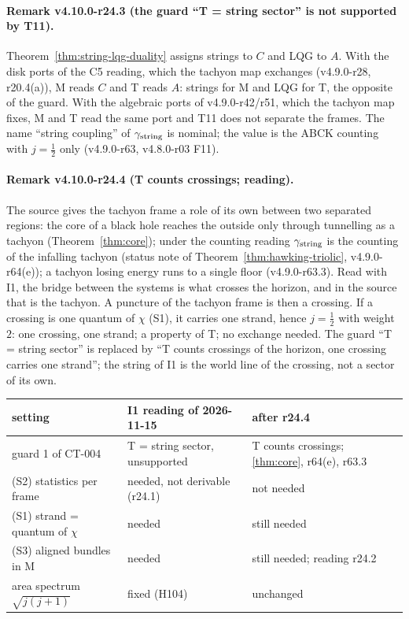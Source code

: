 \paragraph{Remark v4.10.0-r24.3 (the guard ``T = string sector'' is not supported by T11).}
Theorem~\ref{thm:string-lqg-duality} assigns strings to \(C\) and LQG to \(A\).  With the disk ports of the C5 reading, which the tachyon map
exchanges (v4.9.0-r28, r20.4(a)), M reads \(C\) and T reads \(A\): strings for M and LQG for T, the opposite of the guard.  With the
algebraic ports of v4.9.0-r42/r51, which the tachyon map fixes, M and T read the same port and T11 does not separate the frames.  The
name ``string coupling'' of \(\gamma_{\mathrm{string}}\) is nominal; the value is the ABCK counting with \(j=\tfrac12\) only (v4.9.0-r63, v4.8.0-r03 F11).

\paragraph{Remark v4.10.0-r24.4 (T counts crossings; reading).}
The source gives the tachyon frame a role of its own between two separated regions: the core of a black hole reaches the outside only
through tunnelling as a tachyon (Theorem~\ref{thm:core}); under the counting reading \(\gamma_{\mathrm{string}}\) is the counting of the infalling tachyon
(status note of Theorem~\ref{thm:hawking-triolic}, v4.9.0-r64(e)); a tachyon losing energy runs to a single floor (v4.9.0-r63.3).  Read
with I1, the bridge between the systems is what crosses the horizon, and in the source that is the tachyon.  A puncture of the tachyon
frame is then a crossing.  If a crossing is one quantum of \(\chi\) (S1), it carries one strand, hence \(j=\tfrac12\) with weight \(2\):
one crossing, one strand; a property of T; no exchange needed.  The guard ``T = string sector'' is replaced by ``T counts crossings of
the horizon, one crossing carries one strand''; the string of I1 is the world line of the crossing, not a sector of its own.
\begin{center}
\small
\begin{tabular}{@{}>{\raggedright\arraybackslash}p{}>{\raggedright\arraybackslash}p{}>{\raggedright\arraybackslash}p{}@{}}
\toprule
setting & I1 reading of 2026-11-15 & after r24.4\\
\midrule
guard 1 of CT-004 & T = string sector, unsupported & T counts crossings; \ref{thm:core}, r64(e), r63.3\\
(S2) statistics per frame & needed, not derivable (r24.1) & not needed\\
(S1) strand = quantum of \(\chi\) & needed & still needed\\
(S3) aligned bundles in M & needed & still needed; reading r24.2\\
area spectrum \(\sqrt{j(j+1)}\) & fixed (H104) & unchanged\\
\bottomrule
\end{tabular}
\end{center}

